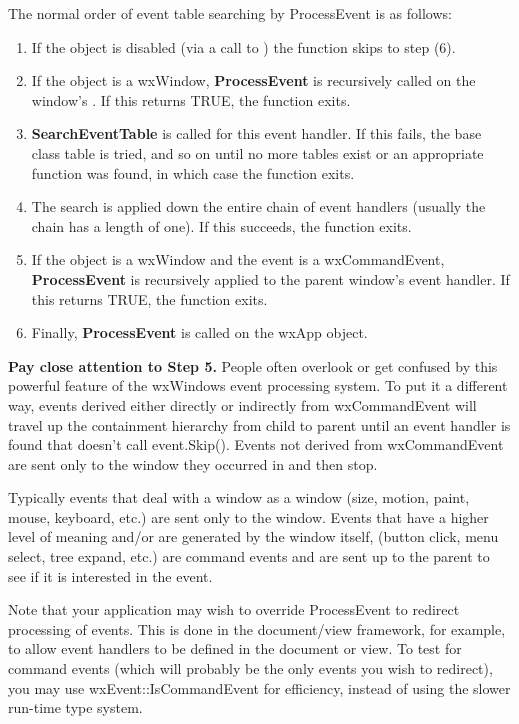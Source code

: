 The normal order of event table searching by ProcessEvent is as follows:

\begin{enumerate}\itemsep=0pt
\item If the object is disabled (via a call to )
the function skips to step (6).
\item If the object is a wxWindow, {\bf ProcessEvent} is recursively called on the window's\rtfsp
{}. If this returns TRUE, the function exits.
\item {\bf SearchEventTable} is called for this event handler. If this fails, the base
class table is tried, and so on until no more tables exist or an appropriate function was found,
in which case the function exits.
\item The search is applied down the entire chain of event handlers (usually the chain has a length
of one). If this succeeds, the function exits.
\item If the object is a wxWindow and the event is a wxCommandEvent, {\bf ProcessEvent} is
recursively applied to the parent window's event handler. If this returns TRUE, the function exits.
\item Finally, {\bf ProcessEvent} is called on the wxApp object.
\end{enumerate}

{\bf Pay close attention to Step 5.}  People often overlook or get
confused by this powerful feature of the wxWindows event processing
system.  To put it a different way, events derived either directly or
indirectly from wxCommandEvent will travel up the containment
hierarchy from child to parent until an event handler is found that
doesn't call event.Skip().  Events not derived from wxCommandEvent are
sent only to the window they occurred in and then stop.

Typically events that deal with a window as a window (size, motion,
paint, mouse, keyboard, etc.) are sent only to the window.  Events
that have a higher level of meaning and/or are generated by the window
itself, (button click, menu select, tree expand, etc.) are command
events and are sent up to the parent to see if it is interested in the
event.

Note that your application may wish to override ProcessEvent to redirect processing of
events. This is done in the document/view framework, for example, to allow event handlers
to be defined in the document or view. To test for command events (which will probably
be the only events you wish to redirect), you may use wxEvent::IsCommandEvent for
efficiency, instead of using the slower run-time type system.

